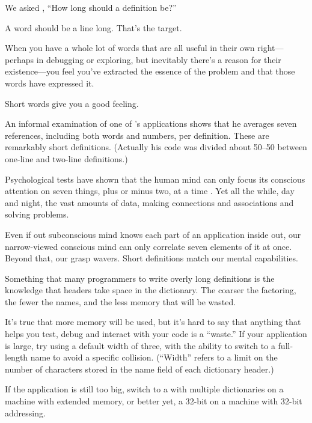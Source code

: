 \begin{interview}
We asked ,
``How long should a \Forth{} definition be?''

\begin{tfquot}
A word should be a line long. That's the target.

When you have a whole lot of words that are all useful in their own
right---perhaps in debugging or exploring, but inevitably there's a
reason for their existence---you feel you've extracted the essence of
the problem and that those words have expressed it.

Short words give you a good feeling.
\end{tfquot}
\end{interview}
An informal examination of one of 's applications shows
that he averages seven references, including both words and numbers,
per definition. These are remarkably short definitions. (Actually his
code was divided about 50--50 between one-line and two-line
definitions.)

Psychological tests have shown that the human mind can only focus its
conscious attention on seven things, plus or minus two, at a time
\cite{miller56}. Yet all the while, day and night, the vast amounts of
data, making connections and associations and solving problems.

Even if out subconscious mind knows each part of an application inside
out, our narrow-viewed conscious mind can only correlate seven
elements of it at once. Beyond that, our grasp wavers. Short
definitions match our mental capabilities.

Something that many \Forth{} programmers to write overly long
definitions is the knowledge that headers take space in the
dictionary. The coarser the factoring, the fewer the names, and the
less memory that will be wasted.

It's true that more memory will be used, but it's hard to say that
anything that helps you test, debug and interact with your code is a
``waste.'' If your application is large, try using a default width of
three, with the ability to switch to a full-length name to avoid a
specific collision. (``Width'' refers to a limit on the number of
characters stored in the name field of each dictionary header.)

If the application is still too big, switch to a \Forth{} with
multiple dictionaries on a machine with extended memory, or better
yet, a 32-bit \Forth{} on a machine with 32-bit addressing.

